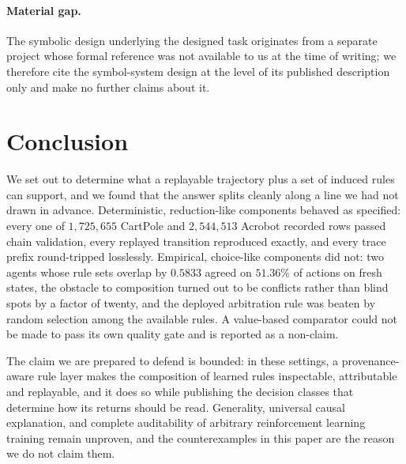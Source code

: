 \documentclass[11pt,a4paper]{article}
\begin{document}
\paragraph{Material gap.} The symbolic design underlying the designed task originates from a separate project whose formal reference was not available to us at the time of writing; we therefore cite the symbol-system design at the level of its published description only and make no further claims about it.

\section{Conclusion}
\label{sec:conclusion}

We set out to determine what a replayable trajectory plus a set of induced rules can support, and we found that the answer splits cleanly along a line we had not drawn in advance. Deterministic, reduction-like components behaved as specified: every one of $1{,}725{,}655$ CartPole and $2{,}544{,}513$ Acrobot recorded rows passed chain validation, every replayed transition reproduced exactly, and every trace prefix round-tripped losslessly. Empirical, choice-like components did not: two agents whose rule sets overlap by $0.5833$ agreed on $51.36\%$ of actions on fresh states, the obstacle to composition turned out to be conflicts rather than blind spots by a factor of twenty, and the deployed arbitration rule was beaten by random selection among the available rules. A value-based comparator could not be made to pass its own quality gate and is reported as a non-claim.

The claim we are prepared to defend is bounded: in these settings, a provenance-aware rule layer makes the composition of learned rules inspectable, attributable and replayable, and it does so while publishing the decision classes that determine how its returns should be read. Generality, universal causal explanation, and complete auditability of arbitrary reinforcement learning training remain unproven, and the counterexamples in this paper are the reason we do not claim them.



\end{document}
